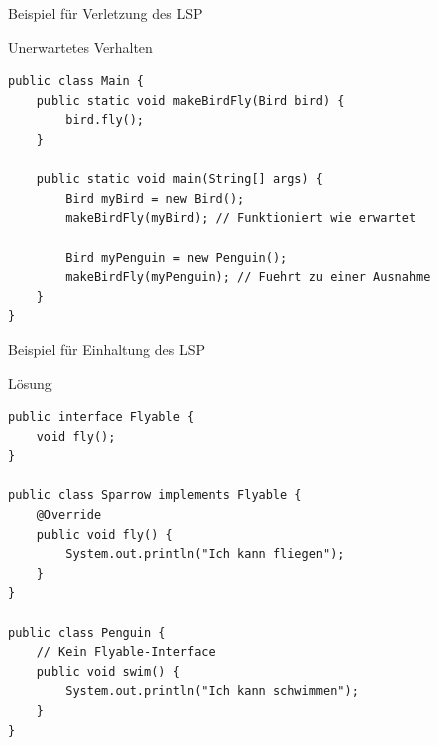 \begin{frame}[fragile]{Beispiel für Verletzung des LSP}
	\begin{alertblock}{Unerwartetes Verhalten}
        \begin{lstlisting}
public class Main {
    public static void makeBirdFly(Bird bird) {
        bird.fly();
    }

    public static void main(String[] args) {
        Bird myBird = new Bird();
        makeBirdFly(myBird); // Funktioniert wie erwartet

        Bird myPenguin = new Penguin();
        makeBirdFly(myPenguin); // Fuehrt zu einer Ausnahme
    }
}
        \end{lstlisting} 		
 	\end{alertblock}
\end{frame}

\begin{frame}[fragile]{Beispiel für Einhaltung des LSP}
	\begin{exampleblock}{Lösung}
        \begin{lstlisting}
public interface Flyable {
    void fly();
}

public class Sparrow implements Flyable {
    @Override
    public void fly() {
        System.out.println("Ich kann fliegen");
    }
}

public class Penguin {
    // Kein Flyable-Interface
    public void swim() {
        System.out.println("Ich kann schwimmen");
    }
}
        \end{lstlisting} 		
 	\end{exampleblock}
\end{frame}

